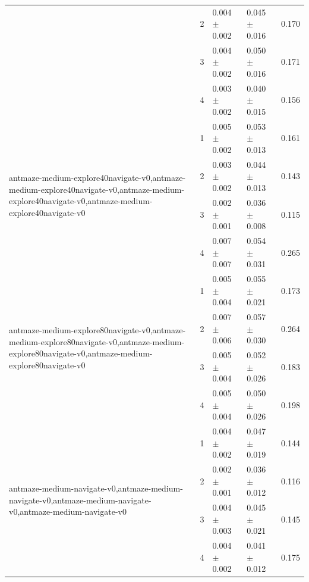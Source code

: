 \begin{tabular}{lllll}
 & 2 & 0.004 $\pm$ 0.002 & 0.045 $\pm$ 0.016 & 0.170 \\
 & 3 & 0.004 $\pm$ 0.002 & 0.050 $\pm$ 0.016 & 0.171 \\
 & 4 & 0.003 $\pm$ 0.002 & 0.040 $\pm$ 0.015 & 0.156 \\
\cline{1-5}
\multirow[t]{4}{*}{antmaze-medium-explore40navigate-v0,antmaze-medium-explore40navigate-v0,antmaze-medium-explore40navigate-v0,antmaze-medium-explore40navigate-v0} & 1 & 0.005 $\pm$ 0.002 & 0.053 $\pm$ 0.013 & 0.161 \\
 & 2 & 0.003 $\pm$ 0.002 & 0.044 $\pm$ 0.013 & 0.143 \\
 & 3 & 0.002 $\pm$ 0.001 & 0.036 $\pm$ 0.008 & 0.115 \\
 & 4 & 0.007 $\pm$ 0.007 & 0.054 $\pm$ 0.031 & 0.265 \\
\cline{1-5}
\multirow[t]{4}{*}{antmaze-medium-explore80navigate-v0,antmaze-medium-explore80navigate-v0,antmaze-medium-explore80navigate-v0,antmaze-medium-explore80navigate-v0} & 1 & 0.005 $\pm$ 0.004 & 0.055 $\pm$ 0.021 & 0.173 \\
 & 2 & 0.007 $\pm$ 0.006 & 0.057 $\pm$ 0.030 & 0.264 \\
 & 3 & 0.005 $\pm$ 0.004 & 0.052 $\pm$ 0.026 & 0.183 \\
 & 4 & 0.005 $\pm$ 0.004 & 0.050 $\pm$ 0.026 & 0.198 \\
\cline{1-5}
\multirow[t]{4}{*}{antmaze-medium-navigate-v0,antmaze-medium-navigate-v0,antmaze-medium-navigate-v0,antmaze-medium-navigate-v0} & 1 & 0.004 $\pm$ 0.002 & 0.047 $\pm$ 0.019 & 0.144 \\
 & 2 & 0.002 $\pm$ 0.001 & 0.036 $\pm$ 0.012 & 0.116 \\
 & 3 & 0.004 $\pm$ 0.003 & 0.045 $\pm$ 0.021 & 0.145 \\
 & 4 & 0.004 $\pm$ 0.002 & 0.041 $\pm$ 0.012 & 0.175 \\
\cline{1-5}
\bottomrule
\end{tabular}
